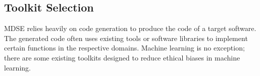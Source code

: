 \documentclass[sigconf,review]{acmart}
\begin{document}

\subsection{Toolkit Selection}
\label{sec:toolkit_selection}
MDSE relies heavily on code generation to produce the code of a target software. The generated code often uses existing tools or software libraries to implement certain  functions in the respective domains. Machine learning is no exception;
there are some existing toolkits designed to reduce ethical biases in machine learning. 
\end{document}
